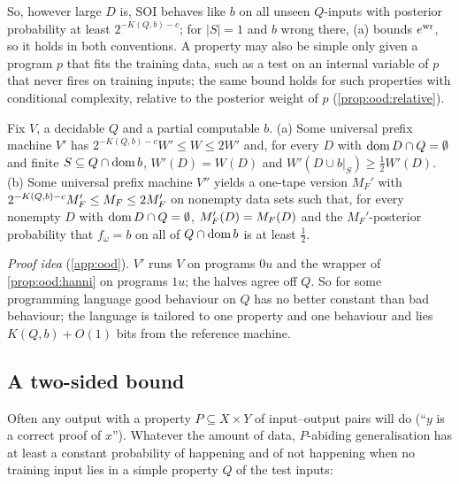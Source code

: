 So, however large $D$ is, SOI behaves like $b$ on all unseen $Q$-inputs with posterior probability at least $2^{-K(Q,b)-c}$; for $|S|=1$ and $b$ wrong there, (a) bounds $e^{\rm wr}$, so it holds in both conventions. A property may also be simple only given a program $p$ that fits the training data, such as a test on an internal variable of $p$ that never fires on training inputs; the same bound holds for such properties with conditional complexity, relative to the posterior weight of $p$ (\cref{prop:ood:relative}).

\begin{proposition}\label{prop:ood:machine}
Fix $V$, a decidable $Q$ and a partial computable $b$. (a) Some universal prefix machine $V'$ has $2^{-K(Q,b)-c}W'\le W\le2W'$ and, for every $D$ with $\operatorname{dom} D\cap Q=\emptyset$ and finite $S\subseteq Q\cap\operatorname{dom} b$, $W'(D)=W(D)$ and $W'(D\cup b|_S)\ge\frac12W'(D)$. (b) Some universal prefix machine $V''$ yields a one-tape version $M_F'$ with $2^{-K(Q,b)-c}M_F'\le M_{F}\le2M_F'$ on nonempty data sets such that, for every nonempty $D$ with $\operatorname{dom} D\cap Q=\emptyset$, $M_F'(D)=M_{F}(D)$ and the $M_F'$-posterior probability that $f_\omega=b$ on all of $Q\cap\operatorname{dom} b$ is at least $\frac12$.
\end{proposition}

\emph{Proof idea} (\cref{app:ood}). $V'$ runs $V$ on programs $0u$ and the wrapper of \cref{prop:ood:hanni} on programs $1u$; the halves agree off $Q$. So for some programming language good behaviour on $Q$ has no better constant than bad behaviour; the language is tailored to one property and one behaviour and lies $K(Q,b)+O(1)$ bits from the reference machine.

\subsection{A two-sided bound}\label{sec:ood:twosided}

Often any output with a property $P\subseteq X\times Y$ of input--output pairs will do (``$y$ is a correct proof of $x$''). Whatever the amount of data, $P$-abiding generalisation has at least a constant probability of happening and of not happening when no training input lies in a simple property $Q$ of the test inputs:

